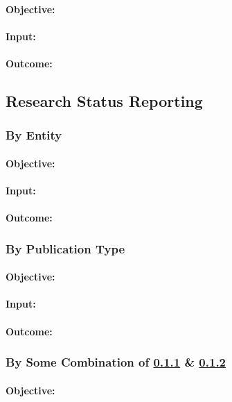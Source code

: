 \paragraph{Objective:}
\paragraph{Input:}
\paragraph{Outcome:}

\subsection{Research Status Reporting}
\subsubsection{By Entity} \label{ti_sr_entity}
\paragraph{Objective:}
\paragraph{Input:}
\paragraph{Outcome:}
\subsubsection{By Publication Type} \label{ti_sr_pubtype}
\paragraph{Objective:}
\paragraph{Input:}
\paragraph{Outcome:}
\subsubsection{By Some Combination of \ref{ti_sr_entity} \& \ref{ti_sr_pubtype}}
\paragraph{Objective:}
